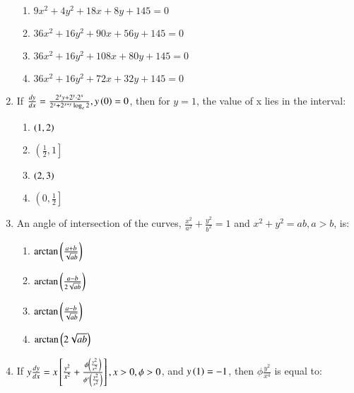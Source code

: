 \documentclass[journal]{IEEEtran}
\begin{document}
\begin{enumerate}
        \begin{multicols}{2}
            \begin{enumerate}
                \item $9x^2+4y^2+18x+8y+145=0$
                \item $36x^2+16y^2+90x+56y+145=0$
                \item $36x^2+16y^2+108x+80y+145=0$
                \item $36x^2+16y^2+72x+32y+145=0$
            \end{enumerate}
        \end{multicols}

    \item If $\frac{dy}{dx}=\frac{2^xy+2^y\cdot 2^x}{2^x+2^{x+y}\log_e2}, y\left(0\right)=0$, then for $y=1$, the value of x lies in the interval:

        \begin{multicols}{4}
            \begin{enumerate}
                \item $\left(1,2\right)$
                \item $\left( \frac{1}{2},1\right]$
                \item  $\left(2,3\right)$
                \item $\left( 0,\frac{1}{2}\right]$
            \end{enumerate}
        \end{multicols}
        
    \item An angle of intersection of the curves, $\frac{x^2}{a^2}+\frac{y^2}{b^2}=1$ and $x^2+y^2=ab,a>b$, is:

        \begin{multicols}{4}
            \begin{enumerate}
                \item $\arctan\left(\frac{a+b}{\sqrt{ab}}\right)$
                \item $\arctan\left(\frac{a-b}{2\sqrt{ab}}\right)$
                \item $\arctan\left(\frac{a-b}{\sqrt{ab}}\right)$
                \item $\arctan\left(2\sqrt{ab}\right)$
            \end{enumerate}
        \end{multicols}

    \item If $y\frac{dy}{dx}=x{}\left[\frac{y^2}{x^2}+\frac{\phi\left(\frac{y^2}{x^2}\right)}{\phi'\left(\frac{y^2}{x^2}\right)}\right],x>0,\phi>0$, and $y\left(1\right)=-1$, then $\phi\frac{y^2}{x^4}$ is equal to:


\end{enumerate}
\end{document}
